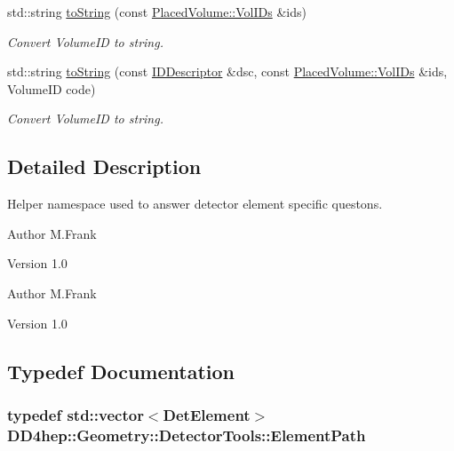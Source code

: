 \begin{DoxyCompactItemize}
std::string \hyperlink{namespace_d_d4hep_1_1_geometry_1_1_detector_tools_accc8aeaf883652cfb64beae7479b9f11}{toString} (const \hyperlink{class_d_d4hep_1_1_geometry_1_1_placed_volume_extension_1_1_vol_i_ds}{PlacedVolume::VolIDs} \&ids)
\begin{DoxyCompactList}\small\item\em Convert VolumeID to string. \item\end{DoxyCompactList}\item 
std::string \hyperlink{namespace_d_d4hep_1_1_geometry_1_1_detector_tools_ae5de1f83490fd1476f7663078ffc08c7}{toString} (const \hyperlink{class_d_d4hep_1_1_geometry_1_1_i_d_descriptor}{IDDescriptor} \&dsc, const \hyperlink{class_d_d4hep_1_1_geometry_1_1_placed_volume_extension_1_1_vol_i_ds}{PlacedVolume::VolIDs} \&ids, VolumeID code)
\begin{DoxyCompactList}\small\item\em Convert VolumeID to string. \item\end{DoxyCompactList}\end{DoxyCompactItemize}


\subsection{Detailed Description}
Helper namespace used to answer detector element specific questons. \begin{DoxyAuthor}{Author}
M.Frank 
\end{DoxyAuthor}
\begin{DoxyVersion}{Version}
1.0
\end{DoxyVersion}
\begin{DoxyAuthor}{Author}
M.Frank 
\end{DoxyAuthor}
\begin{DoxyVersion}{Version}
1.0 
\end{DoxyVersion}


\subsection{Typedef Documentation}
\hypertarget{namespace_d_d4hep_1_1_geometry_1_1_detector_tools_a57c8f37a975258fd84676a69e74c56ab}{
\subsubsection[{ElementPath}]{\setlength{\rightskip}{0pt plus 5cm}typedef std::vector$<${\bf DetElement}$>$ {\bf DD4hep::Geometry::DetectorTools::ElementPath}}}
\label{namespace_d_d4hep_1_1_geometry_1_1_detector_tools_a57c8f37a975258fd84676a69e74c56ab}


